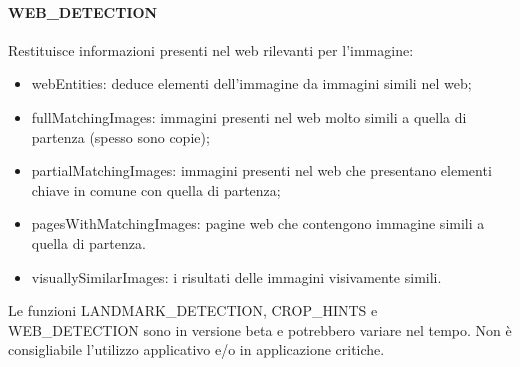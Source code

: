 \paragraph{\textsf{WEB\_DETECTION}} Restituisce informazioni presenti nel web rilevanti per l'immagine:
\begin{itemize}
\item \textsf{webEntities}: deduce elementi dell'immagine da immagini simili nel web;
\item \textsf{fullMatchingImages}: immagini presenti nel web molto simili a quella di partenza (spesso sono copie);
\item \textsf{partialMatchingImages}: immagini presenti nel web che presentano elementi chiave in comune con quella di partenza;
\item \textsf{pagesWithMatchingImages}: pagine web che contengono immagine simili a quella di partenza.
\item \textsf{visuallySimilarImages}: i risultati delle immagini visivamente simili.
\end{itemize}
%
Le funzioni \textsf{LANDMARK\_DETECTION}, \textsf{CROP\_HINTS} e \textsf{WEB\_DETECTION} sono in versione beta e potrebbero variare nel tempo.
Non è consigliabile l'utilizzo applicativo e/o in applicazione critiche.
%
